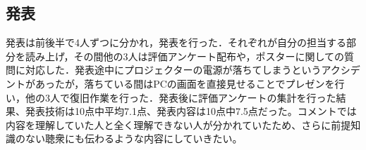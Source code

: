 \documentclass[openany,11pt,papersize]{jsbook}
\begin{document}

\subsection{発表}
発表は前後半で4人ずつに分かれ，発表を行った．それぞれが自分の担当する部分を読み上げ，その間他の3人は評価アンケート配布や，ポスターに関しての質問に対応した．発表途中にプロジェクターの電源が落ちてしまうというアクシデントがあったが，落ちている間はPCの画面を直接見せることでプレゼンを行い，他の3人で復旧作業を行った．発表後に評価アンケートの集計を行った結果、発表技術は10点中平均7.1点、発表内容は10点中7.5点だった。コメントでは内容を理解していた人と全く理解できない人が分かれていたため、さらに前提知識のない聴衆にも伝わるような内容にしていきたい。

\end{document}
